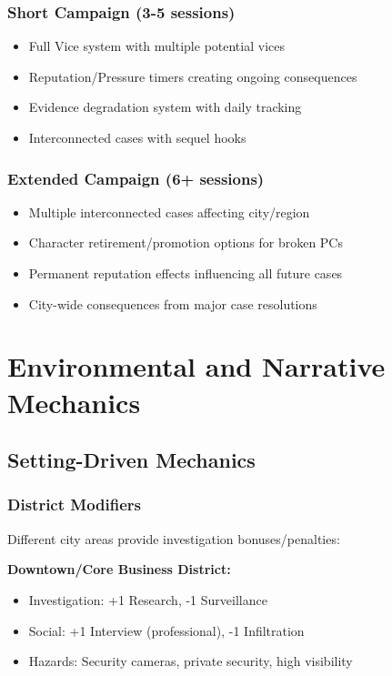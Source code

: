\documentclass[11pt]{article}
\begin{document}
\subsubsection{Short Campaign (3-5 sessions)}

\begin{itemize}
\item Full Vice system with multiple potential vices
\item Reputation/Pressure timers creating ongoing consequences
\item Evidence degradation system with daily tracking
\item Interconnected cases with sequel hooks
\end{itemize}

\subsubsection{Extended Campaign (6+ sessions)}

\begin{itemize}
\item Multiple interconnected cases affecting city/region
\item Character retirement/promotion options for broken PCs
\item Permanent reputation effects influencing all future cases
\item City-wide consequences from major case resolutions
\end{itemize}

\section{Environmental and Narrative Mechanics}

\subsection{Setting-Driven Mechanics}

\subsubsection{District Modifiers}

Different city areas provide investigation bonuses/penalties:

\textbf{Downtown/Core Business District:}
\begin{itemize}
\item Investigation: +1 Research, -1 Surveillance
\item Social: +1 Interview (professional), -1 Infiltration
\item Hazards: Security cameras, private security, high visibility
\end{itemize}
\end{document}
